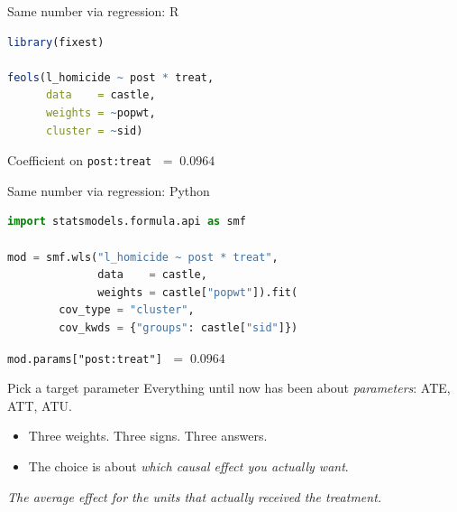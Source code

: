 \documentclass[aspectratio=169,11pt]{beamer}
\begin{document}
\begin{frame}[fragile]{Same number via regression: R}
\vspace{0.6em}
\begin{lstlisting}[language=R,basicstyle=\ttfamily\small]
library(fixest)

feols(l_homicide ~ post * treat,
      data    = castle,
      weights = ~popwt,
      cluster = ~sid)
\end{lstlisting}

\vspace{0.8em}
\begin{center}
Coefficient on \texttt{post:treat} $\;=\; \mathbf{0.0964}$
\end{center}
\end{frame}

\begin{frame}[fragile]{Same number via regression: Python}
\vspace{0.6em}
\begin{lstlisting}[language=Python,basicstyle=\ttfamily\small]
import statsmodels.formula.api as smf

mod = smf.wls("l_homicide ~ post * treat",
              data    = castle,
              weights = castle["popwt"]).fit(
        cov_type = "cluster",
        cov_kwds = {"groups": castle["sid"]})
\end{lstlisting}

\vspace{0.8em}
\begin{center}
\texttt{mod.params["post:treat"]} $\;=\; \mathbf{0.0964}$
\end{center}
\end{frame}

\begin{frame}{Pick a target parameter}
\vspace{0.6em}
Everything until now has been about \textit{parameters}: ATE, ATT, ATU.
\vspace{0.3em}
\begin{itemize}
  \item Three weights. Three signs. Three answers.
  \item The choice is about \textit{which causal effect you actually want}.
\end{itemize}

\vspace{1.2em}
\begin{center}
\Large{}
\end{center}

\vspace{0.8em}
\begin{center}
\small\color{warmgray}\itshape The average effect for the units that actually received the treatment.
\end{center}
\end{frame}
\end{document}
